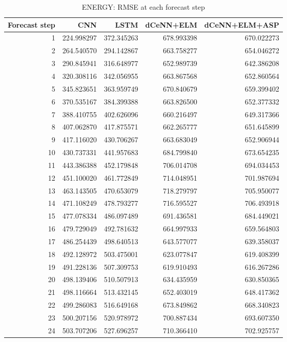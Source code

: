 \begin{table}
\caption{ENERGY: RMSE at each forecast step}
\begin{tabular}{rrrrr}
\toprule
Forecast step & CNN & LSTM & dCeNN+ELM & dCeNN+ELM+ASP \\
\midrule
1 & 224.998297 & 372.345263 & 678.993398 & 670.022273 \\
2 & 264.540570 & 294.142867 & 663.758277 & 654.046272 \\
3 & 290.845941 & 316.648977 & 652.989739 & 642.386208 \\
4 & 320.308116 & 342.056955 & 663.867568 & 652.860564 \\
5 & 345.823651 & 363.959749 & 670.840679 & 659.399402 \\
6 & 370.535167 & 384.399388 & 663.826500 & 652.377332 \\
7 & 388.410755 & 402.626096 & 660.216497 & 649.317366 \\
8 & 407.062870 & 417.875571 & 662.265777 & 651.645899 \\
9 & 417.116020 & 430.706267 & 663.683049 & 652.906944 \\
10 & 430.737331 & 441.957683 & 684.799840 & 673.654235 \\
11 & 443.386388 & 452.179848 & 706.014708 & 694.034453 \\
12 & 451.100020 & 461.772849 & 714.048951 & 701.987694 \\
13 & 463.143505 & 470.653079 & 718.279797 & 705.950077 \\
14 & 471.108249 & 478.793277 & 716.595527 & 706.493918 \\
15 & 477.078334 & 486.097489 & 691.436581 & 684.449021 \\
16 & 479.729049 & 492.781632 & 664.997933 & 659.564803 \\
17 & 486.254439 & 498.640513 & 643.577077 & 639.358037 \\
18 & 492.128972 & 503.475001 & 623.077847 & 619.408399 \\
19 & 491.228136 & 507.309753 & 619.910493 & 616.267286 \\
20 & 498.139406 & 510.507913 & 634.435959 & 630.850365 \\
21 & 498.116664 & 513.432145 & 652.403019 & 648.417362 \\
22 & 499.286083 & 516.649168 & 673.849862 & 668.340823 \\
23 & 500.207156 & 520.978972 & 700.887434 & 693.607350 \\
24 & 503.707206 & 527.696257 & 710.366410 & 702.925757 \\
\bottomrule
\end{tabular}
\end{table}
